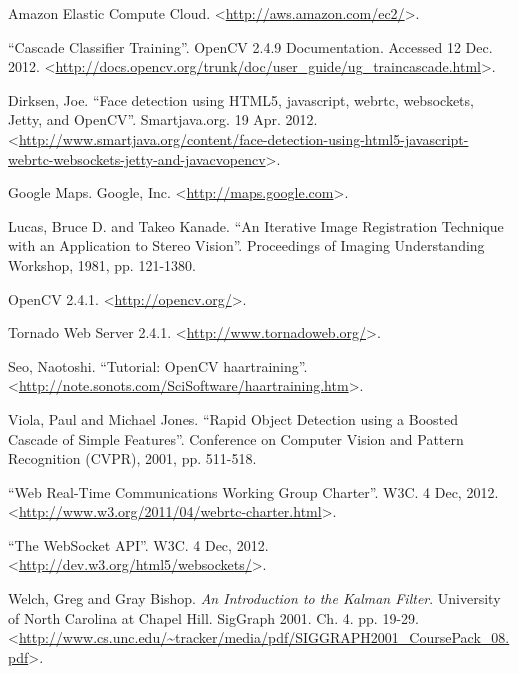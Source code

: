 \documentclass[12pt]{article}
\begin{document}
\begin{thebibliography}{99}

Amazon Elastic Compute Cloud. \textless\url{http://aws.amazon.com/ec2/}\textgreater.

  ``Cascade Classifier Training''. OpenCV 2.4.9 Documentation. Accessed 12 Dec. 2012. \textless\url{http://docs.opencv.org/trunk/doc/user_guide/ug_traincascade.html}\textgreater.

Dirksen, Joe. ``Face detection using HTML5, javascript, webrtc, websockets, Jetty, and OpenCV''. Smartjava.org. 19 Apr. 2012. \textless\url{http://www.smartjava.org/content/face-detection-using-html5-javascript-webrtc-websockets-jetty-and-javacvopencv}\textgreater.

Google Maps. Google, Inc. \textless\url{http://maps.google.com}\textgreater.

Lucas, Bruce D. and Takeo Kanade. ``An Iterative Image Registration Technique with an Application to Stereo Vision''. Proceedings of Imaging Understanding Workshop, 1981, pp. 121-1380. 

OpenCV 2.4.1. \textless\url{http://opencv.org/}\textgreater.

Tornado Web Server 2.4.1. \textless\url{http://www.tornadoweb.org/}\textgreater.

Seo, Naotoshi. ``Tutorial: OpenCV haartraining''. \textless\url{http://note.sonots.com/SciSoftware/haartraining.htm}\textgreater.

Viola, Paul and Michael Jones. ``Rapid Object Detection using a Boosted Cascade of Simple Features''. Conference on Computer Vision and Pattern Recognition (CVPR), 2001, pp. 511-518. 

``Web Real-Time Communications Working Group Charter''. W3C. 4 Dec, 2012. \textless\url{http://www.w3.org/2011/04/webrtc-charter.html}\textgreater.

``The WebSocket API''. W3C. 4 Dec, 2012. \textless\url{http://dev.w3.org/html5/websockets/}\textgreater.

Welch, Greg and Gray Bishop. \emph{An Introduction to the Kalman Filter}. University of North Carolina at Chapel Hill. SigGraph 2001. Ch. 4. pp. 19-29. \textless\url{http://www.cs.unc.edu/~tracker/media/pdf/SIGGRAPH2001_CoursePack_08.pdf}\textgreater.

\end{thebibliography}
\end{document}
